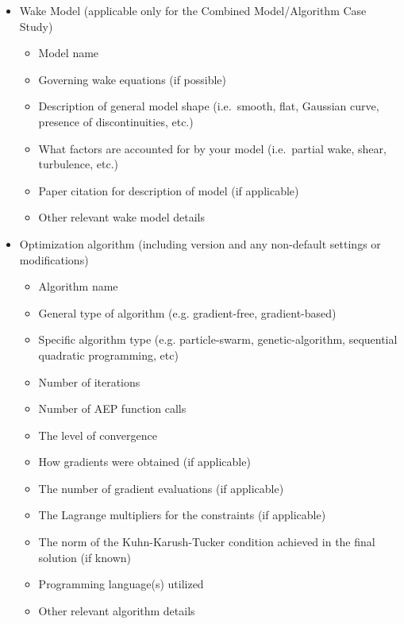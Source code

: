 \documentclass[12pt]{article}
\begin{document}
            \begin{itemize}
                \item Wake Model (applicable only for the Combined Model/Algorithm Case Study)
                \begin{itemize}
                    \item Model name
                    \item Governing wake equations (if possible)
                    \item Description of general model shape (i.e.~smooth, flat, Gaussian curve, presence of discontinuities, etc.)
                    \item What factors are accounted for by your model (i.e.~partial wake, shear, turbulence, etc.)
                    \item Paper citation for description of model (if applicable)
                    \item Other relevant wake model details
                \end{itemize}
                \item Optimization algorithm (including version and any non-default settings or modifications)
                \begin{itemize}
                	\item Algorithm name
                    \item General type of algorithm (e.g. gradient-free, gradient-based)
                    \item Specific algorithm type (e.g. particle-swarm, genetic-algorithm, sequential quadratic programming, etc)
                    \item Number of iterations
                    \item Number of AEP function calls
                    \item The level of convergence
                    \item How gradients were obtained (if applicable)
                    \item The number of gradient evaluations (if applicable)
                    \item The Lagrange multipliers for the constraints (if applicable)
                    \item The norm of the Kuhn-Karush-Tucker condition achieved in the final solution (if known)
                    \item Programming language(s) utilized
                    \item Other relevant algorithm details

\end{itemize}
\end{itemize}
\end{document}
